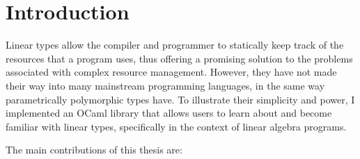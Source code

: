 \chapter{Introduction}


% 
% 

Linear types allow the compiler and programmer to statically keep track of the
resources that a program uses, thus offering a promising solution to the
problems associated with complex resource management. However, they have not
made their way into many mainstream programming languages, in the same way
parametrically polymorphic types have. To illustrate their simplicity and
power, I implemented an OCaml library that allows users to learn about and
become familiar with linear types, specifically in the context of linear
algebra programs.

The main contributions of this thesis are:

